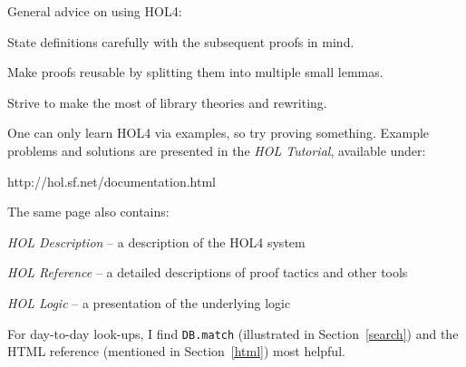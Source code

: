 \documentclass[a4paper,10pt]{article}
\begin{document}
General advice on using HOL4:
\begin{enum}
\item State definitions carefully with the subsequent proofs in mind.
\item Make proofs reusable by splitting them into multiple small lemmas.
\item Strive to make the most of library theories and rewriting.
\end{enum}
One can only learn HOL4 via examples, so try proving something.
Example problems and solutions are presented in the \emph{HOL
  Tutorial}, available under:
\begin{code}
http://hol.sf.net/documentation.html
\end{code}
The same page also contains:
\begin{enum}
\item[~]\emph{HOL Description} -- a description of the HOL4 system
\item[~]\emph{HOL Reference} -- a detailed descriptions of proof tactics and other tools
\item[~]\emph{HOL Logic} -- a presentation of the underlying logic
\end{enum}
For day-to-day look-ups, I find {\tt DB.match} (illustrated in
Section~\ref{search}) and the HTML reference (mentioned in
Section~\ref{html}) most helpful.
\end{document}
